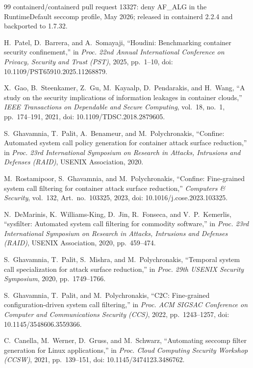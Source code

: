 \begin{thebibliography}{99}
 containerd/containerd pull request 13327: deny AF\_ALG in the RuntimeDefault seccomp profile, May 2026; released in containerd 2.2.4 and backported to 1.7.32.

 H.~Patel, D.~Barrera, and A.~Somayaji, ``Houdini: Benchmarking container security confinement,'' in \emph{Proc. 22nd Annual International Conference on Privacy, Security and Trust (PST)}, 2025, pp.~1--10, doi: 10.1109/PST65910.2025.11268879.

 X.~Gao, B.~Steenkamer, Z.~Gu, M.~Kayaalp, D.~Pendarakis, and H.~Wang, ``A study on the security implications of information leakages in container clouds,'' \emph{IEEE Transactions on Dependable and Secure Computing}, vol.~18, no.~1, pp.~174--191, 2021, doi: 10.1109/TDSC.2018.2879605.

 S.~Ghavamnia, T.~Palit, A.~Benameur, and M.~Polychronakis, ``Confine: Automated system call policy generation for container attack surface reduction,'' in \emph{Proc. 23rd International Symposium on Research in Attacks, Intrusions and Defenses (RAID)}, USENIX Association, 2020.

 M.~Rostamipoor, S.~Ghavamnia, and M.~Polychronakis, ``Confine: Fine-grained system call filtering for container attack surface reduction,'' \emph{Computers \& Security}, vol.~132, Art.~no.~103325, 2023, doi: 10.1016/j.cose.2023.103325.

 N.~DeMarinis, K.~Williams-King, D.~Jin, R.~Fonseca, and V.~P.~Kemerlis, ``sysfilter: Automated system call filtering for commodity software,'' in \emph{Proc. 23rd International Symposium on Research in Attacks, Intrusions and Defenses (RAID)}, USENIX Association, 2020, pp.~459--474.

 S.~Ghavamnia, T.~Palit, S.~Mishra, and M.~Polychronakis, ``Temporal system call specialization for attack surface reduction,'' in \emph{Proc. 29th USENIX Security Symposium}, 2020, pp.~1749--1766.

 S.~Ghavamnia, T.~Palit, and M.~Polychronakis, ``C2C: Fine-grained configuration-driven system call filtering,'' in \emph{Proc. ACM SIGSAC Conference on Computer and Communications Security (CCS)}, 2022, pp.~1243--1257, doi: 10.1145/3548606.3559366.

 C.~Canella, M.~Werner, D.~Gruss, and M.~Schwarz, ``Automating seccomp filter generation for Linux applications,'' in \emph{Proc. Cloud Computing Security Workshop (CCSW)}, 2021, pp.~139--151, doi: 10.1145/3474123.3486762.


\end{thebibliography}
